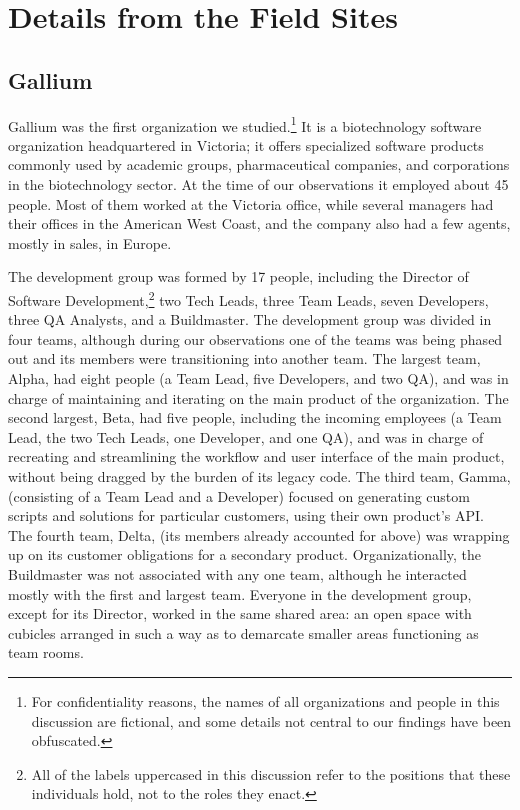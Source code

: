 \documentclass[10pt, conference, compsocconf]{IEEEtran}
\begin{document}

\section{Details from the Field Sites}

\subsection{Gallium}

Gallium was the first organization we studied.\footnote{For confidentiality reasons, the names of all organizations and people in this discussion are fictional, and some details not central to our findings have been obfuscated.} It is a biotechnology software organization headquartered in Victoria; it offers specialized software products commonly used by academic groups, pharmaceutical companies, and corporations in the biotechnology sector. At the time of our observations it employed about 45 people. Most of them worked at the Victoria office, while several managers had their offices in the American West Coast, and the company also had a few agents, mostly in sales, in Europe.

The development group was formed by 17 people, including the Director of Software Development,\footnote{All of the labels uppercased in this discussion refer to the positions that these individuals hold, not to the roles they enact.} two Tech Leads, three Team Leads, seven Developers, three QA Analysts, and a Buildmaster. The development group was divided in four teams, although during our observations one of the teams was being phased out and its members were transitioning into another team. The largest team, Alpha, had eight people (a Team Lead, five Developers, and two QA), and was in charge of maintaining and iterating on the main product of the organization. The second largest, Beta, had five people, including the incoming employees (a Team Lead, the two Tech Leads, one Developer, and one QA), and was in charge of recreating and streamlining the workflow and user interface of the main product, without being dragged by the burden of its legacy code. The third team, Gamma, (consisting of a Team Lead and a Developer) focused on generating custom scripts and solutions for particular customers, using their own product's API. The fourth team, Delta, (its members already accounted for above) was wrapping up on its customer obligations for a secondary product. Organizationally, the Buildmaster was not associated with any one team, although he interacted mostly with the first and largest team. Everyone in the development group, except for its Director, worked in the same shared area: an open space with cubicles arranged in such a way as to demarcate smaller areas functioning as team rooms.
\end{document}

